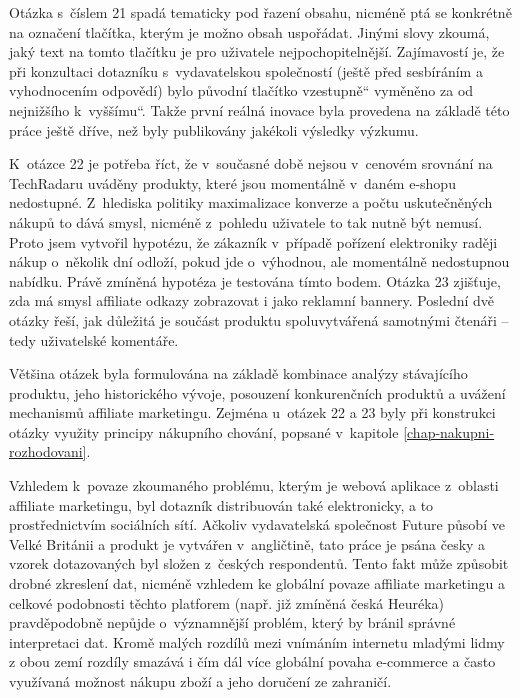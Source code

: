 \documentclass[12pt,oneside,openany]{fithesis}
\begin{document}
Otázka s~číslem 21 spadá tematicky pod řazení obsahu, nicméně ptá se 
konkrétně na označení tlačítka, kterým je možno obsah uspořádat. 
Jinými slovy zkoumá, jaký text na tomto tlačítku je pro uživatele 
nejpochopitelnější. Zajímavostí je, že při konzultaci dotazníku 
s~vydavatelskou společností (ještě před sesbíráním a vyhodnocením 
odpovědí) bylo původní tlačítko \glqq vzestupně\textquotedblleft{} 
vyměněno za \glqq od nejnižšího k~vyššímu\textquotedblleft{}. Takže 
první reálná inovace byla provedena na základě této práce ještě 
dříve, než byly publikovány jakékoli výsledky výzkumu.

K~otázce 22 je potřeba říct, že v~současné době nejsou v~cenovém 
srovnání na TechRadaru uváděny produkty, které jsou momentálně v~daném 
e-shopu nedostupné. Z~hlediska politiky maximalizace konverze a počtu 
uskutečněných nákupů to dává smysl, nicméně z~pohledu uživatele to 
tak nutně být nemusí. Proto jsem vytvořil hypotézu, že zákazník 
v~případě pořízení elektroniky raději nákup o~několik dní odloží, 
pokud jde o~výhodnou, ale momentálně nedostupnou nabídku. Právě 
zmíněná hypotéza je testována tímto bodem. Otázka 23 zjišťuje, zda má 
smysl affiliate odkazy zobrazovat i jako reklamní bannery. Poslední dvě 
otázky řeší, jak důležitá je součást produktu spoluvytvářená 
samotnými čtenáři -- tedy uživatelské komentáře.

Většina otázek byla formulována na základě kombinace analýzy 
stávajícího produktu, jeho historického vývoje, posouzení konkurenčních 
produktů a uvážení mechanismů affiliate marketingu. Zejména u~otázek 22 
a 23 byly při konstrukci otázky využity principy nákupního chování, 
popsané v~kapitole 
\hyperlink{chap-nakupni-rozhodovani}{{\ref{chap-nakupni-rozhodovani}}}.

Vzhledem k~povaze zkoumaného problému, kterým je webová aplikace z~oblasti 
affiliate marketingu, byl dotazník distribuován také elektronicky, a to 
prostřednictvím sociálních sítí. Ačkoliv vydavatelská společnost 
Future působí ve Velké Británii a produkt je vytvářen v~angličtině, 
tato práce je psána česky a vzorek dotazovaných byl složen z~českých 
respondentů. Tento fakt může způsobit drobné zkreslení dat, nicméně 
vzhledem ke globální povaze affiliate marketingu a celkové podobnosti 
těchto platforem (např. již zmíněná česká Heuréka) pravděpodobně 
nepůjde o~významnější problém, který by bránil správné interpretaci 
dat. Kromě malých rozdílů mezi vnímáním internetu mladými lidmy z obou
zemí rozdíly smazává i čím dál více globální povaha e-commerce a 
často využívaná možnost nákupu zboží a jeho doručení ze zahraničí.
\end{document}
